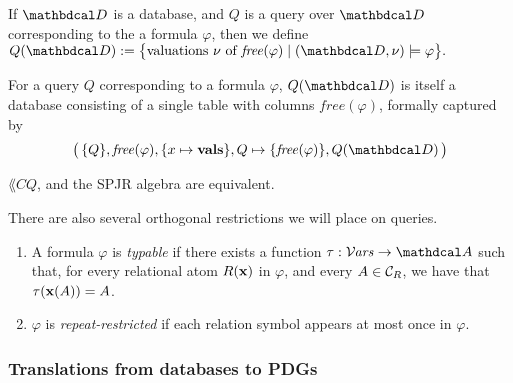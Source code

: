 \documentclass[the-pdg-manual.tex]{subfiles}
\begin{document}
\begin{defn}
	If $\D$ is a database, and $Q$ is a query over $\D$ corresponding to the a formula $\varphi$, then we define
	$ Q(\D) := \big\{ \text{valuations $\nu$ of $\mathit{free}(\varphi)$} \mid (\D,\nu) \models \varphi \big\}.$
\end{defn}

\begin{remark}
	For a query $Q$ corresponding to a formula $\varphi$, $Q(\D)$ is itself a database consisting of a single table with columns $\mathit{free}(\varphi)$, formally captured by
	\[ \big(\,\{Q\}, \mathit{free}(\varphi), \{x \mapsto \mathbf{vals}\}, Q\mapsto \{\mathit{free}(\varphi)\}, Q(\D)\,\big) \]
\end{remark}

\begin{fact}
    $\lang{CQ}$, and the SPJR algebra are equivalent.
\end{fact}
% 

There are also several orthogonal restrictions we will place on queries. 
\begin{enumerate}
\item A formula $\varphi$ is \emph{typable} if there exists a function $\tau: \Varis \to \Attrs$ such that, for every relational atom $R(\mathbf x)$ in $\varphi$, and every $A \in \mathcal C_R$, we have that $\tau(\mathbf x(A)) = A$.

\item $\varphi$ is \emph{repeat-restricted} if each relation symbol appears at most once in $\varphi$. 
\end{enumerate}


\subsubsection{Translations from databases to PDGs}

\end{document}
